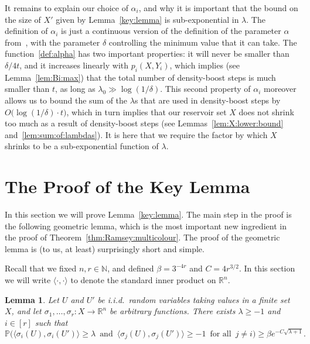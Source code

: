 \documentclass[12pt,reqno]{amsart}
\newtheorem{lemma}[theorem]{Lemma}
\theoremstyle{definition}
\theoremstyle{remark}
\newcommand\N{\mathbb{N}}
\newcommand\R{\mathbb{R}}
\def\Pr{\mathbb{P}}
\renewcommand{\ge}{\geqslant}
\renewcommand{\to}{\rightarrow}
\def\R{\mathbb{R}}
\def\N{\mathbb{N}}
\begin{document}
It remains to explain our choice of \(\alpha_i\), and why it is important that the bound on the size of \(X'\) given by Lemma~\ref{key:lemma} is sub-exponential in \(\lambda\). The definition of \(\alpha_i\) is just a continuous version of the definition of the parameter \(\alpha\) from~\cite{CGMS}, with the parameter \(\delta\) controlling the minimum value that it can take. The function~\eqref{def:alpha} has two important properties: it will never be smaller than \(\delta / 4t\), and it increases linearly with \(p_i(X,Y_i)\), which implies (see Lemma~\ref{lem:Bi:max}) that the total number of density-boost steps is much smaller than \(t\), as long as \(\lambda_0 \gg \log(1/\delta)\). This second property of \(\alpha_i\) moreover allows us to bound the sum of the \(\lambda\)s that are used in density-boost steps by \(O\big( \log(1/\delta) \cdot t \big)\), which in turn implies that our reservoir set \(X\) does not shrink too much as a result of density-boost steps (see Lemmas~\ref{lem:X:lower:bound} and~\ref{lem:sum:of:lambdas}). It is here that we require the factor by which \(X\) shrinks to be a sub-exponential function of \(\lambda\).

\section{The Proof of the Key Lemma}\label{sec:key:lemma}

In this section we will prove Lemma~\ref{key:lemma}. The main step in the proof is the following geometric lemma, which is the most important new ingredient in the proof of Theorem~\ref{thm:Ramsey:multicolour}. The proof of the geometric lemma is (to us, at least) surprisingly short and simple.

Recall that we fixed \(n,r \in \N\), and defined \(\beta = 3^{-4r}\) and \(C = 4r^{3/2}\). In this section we will write \(\langle\cdot,\cdot\rangle\) to denote the standard inner product on \(\R^n\).

%
\begin{lemma}
	\label{lem:lambda}
	Let\/ \(U\) and\/ \(U'\) be i.i.d.~random variables taking values in a finite set~\(X\), and let \(\sigma_1,\ldots,\sigma_r \colon X \to \R^n\) be arbitrary functions. There exists \(\lambda\ge-1\) and\/ \(i\in[r]\) such that
	\begin{equation*}
		\Pr\Big( \big\langle \sigma_i(U),\sigma_i(U') \big\rangle \ge \lambda \, \text{ and } \, \big\langle \sigma_j(U), \sigma_j(U') \big\rangle \ge -1 \, \text{ for all } \, j \ne i \Big) \ge \beta e^{- C\sqrt{\lambda + 1}}.
	\end{equation*}
%
\end{lemma}
%
\end{document}
